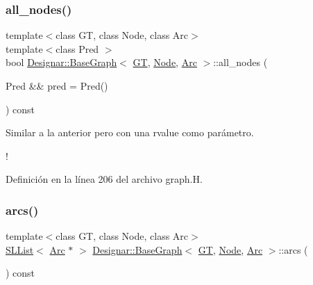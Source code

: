\subsubsection{\texorpdfstring{all\+\_\+nodes()}{all\_nodes()}\hspace{0.1cm}{\footnotesize\ttfamily [2/2]}}
{\footnotesize\ttfamily template$<$class GT, class Node, class Arc$>$ \\
template$<$class Pred $>$ \\
bool \hyperlink{class_designar_1_1_base_graph}{Designar\+::\+Base\+Graph}$<$ \hyperlink{demo-buildgraph_8_c_a3001c40d2c31ca87ed96cd7d1334a55e}{GT}, \hyperlink{namespace_designar_a5af326c65aa2bd26b26c410f2030d09e}{Node}, \hyperlink{namespace_designar_a3f55fb5513d62ff47cbc8f72b8e95d6f}{Arc} $>$\+::all\+\_\+nodes (\begin{DoxyParamCaption}\item[{Pred \&\&}]{pred = {\ttfamily Pred()} }\end{DoxyParamCaption}) const\hspace{0.3cm}{\ttfamily [inline]}}



Similar a la anterior pero con una rvalue como parámetro. 

! 

Definición en la línea 206 del archivo graph.\+H.

\mbox{\label{class_designar_1_1_base_graph_afeff075f6386a31a06a8211e5d11fe1a}} 
\subsubsection{\texorpdfstring{arcs()}{arcs()}}
{\footnotesize\ttfamily template$<$class GT, class Node, class Arc$>$ \\
\hyperlink{class_designar_1_1_s_l_list}{S\+L\+List}$<$ \hyperlink{namespace_designar_a3f55fb5513d62ff47cbc8f72b8e95d6f}{Arc} $\ast$ $>$ \hyperlink{class_designar_1_1_base_graph}{Designar\+::\+Base\+Graph}$<$ \hyperlink{demo-buildgraph_8_c_a3001c40d2c31ca87ed96cd7d1334a55e}{GT}, \hyperlink{namespace_designar_a5af326c65aa2bd26b26c410f2030d09e}{Node}, \hyperlink{namespace_designar_a3f55fb5513d62ff47cbc8f72b8e95d6f}{Arc} $>$\+::arcs (\begin{DoxyParamCaption}{ }\end{DoxyParamCaption}) const\hspace{0.3cm}{\ttfamily [inline]}}



